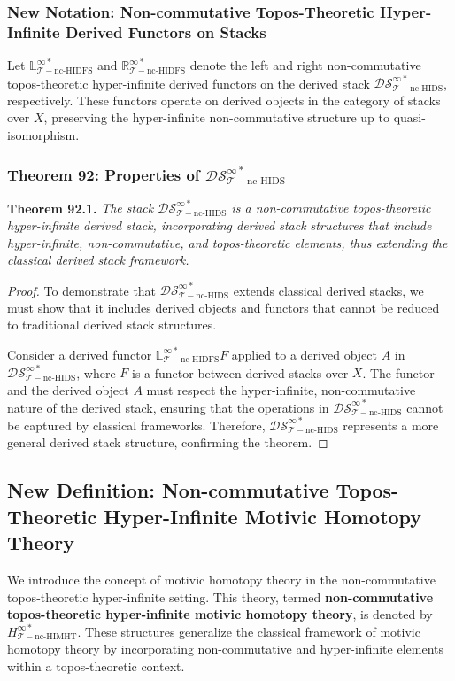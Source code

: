 \documentclass{article}
\begin{document}
\subsubsection{New Notation: Non-commutative Topos-Theoretic Hyper-Infinite Derived Functors on Stacks}
Let \(\mathbb{L}_{\mathcal{T}-\text{nc-HIDFS}}^{\infty *}\) and \(\mathbb{R}_{\mathcal{T}-\text{nc-HIDFS}}^{\infty *}\) denote the left and right non-commutative topos-theoretic hyper-infinite derived functors on the derived stack \(\mathcal{DS}_{\mathcal{T}-\text{nc-HIDS}}^{\infty *}\), respectively. These functors operate on derived objects in the category of stacks over \(X\), preserving the hyper-infinite non-commutative structure up to quasi-isomorphism.

\subsubsection{Theorem 92: Properties of \(\mathcal{DS}_{\mathcal{T}-\text{nc-HIDS}}^{\infty *}\)}
\textbf{Theorem 92.1.} \textit{The stack \(\mathcal{DS}_{\mathcal{T}-\text{nc-HIDS}}^{\infty *}\) is a non-commutative topos-theoretic hyper-infinite derived stack, incorporating derived stack structures that include hyper-infinite, non-commutative, and topos-theoretic elements, thus extending the classical derived stack framework.}

\begin{proof}
To demonstrate that \(\mathcal{DS}_{\mathcal{T}-\text{nc-HIDS}}^{\infty *}\) extends classical derived stacks, we must show that it includes derived objects and functors that cannot be reduced to traditional derived stack structures.

Consider a derived functor \(\mathbb{L}_{\mathcal{T}-\text{nc-HIDFS}}^{\infty *}F\) applied to a derived object \(A\) in \(\mathcal{DS}_{\mathcal{T}-\text{nc-HIDS}}^{\infty *}\), where \(F\) is a functor between derived stacks over \(X\). The functor and the derived object \(A\) must respect the hyper-infinite, non-commutative nature of the derived stack, ensuring that the operations in \(\mathcal{DS}_{\mathcal{T}-\text{nc-HIDS}}^{\infty *}\) cannot be captured by classical frameworks. Therefore, \(\mathcal{DS}_{\mathcal{T}-\text{nc-HIDS}}^{\infty *}\) represents a more general derived stack structure, confirming the theorem.
\end{proof}

\subsection{New Definition: Non-commutative Topos-Theoretic Hyper-Infinite Motivic Homotopy Theory}
We introduce the concept of motivic homotopy theory in the non-commutative topos-theoretic hyper-infinite setting. This theory, termed \textbf{non-commutative topos-theoretic hyper-infinite motivic homotopy theory}, is denoted by \(H_{\mathcal{T}-\text{nc-HIMHT}}^{\infty *}\). These structures generalize the classical framework of motivic homotopy theory by incorporating non-commutative and hyper-infinite elements within a topos-theoretic context.
\end{document}
